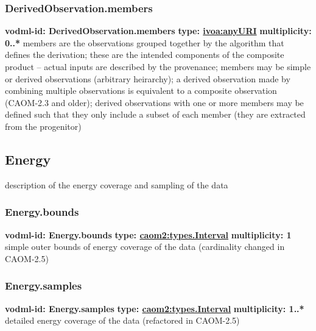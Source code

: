     \subsubsection{DerivedObservation.members}
      \textbf{vodml-id: DerivedObservation.members} \newline
      \textbf{type: \hyperref[sect:ivoa]{ivoa:anyURI}} \newline
      \textbf{multiplicity: 0..*} \newline
      members are the observations grouped together by the algorithm that defines the derivation; these are the intended components of the composite product -- actual inputs are described by the provenance; members may be simple or derived observations (arbitrary heirarchy); a derived observation made by combining multiple observations is equivalent to a composite observation (CAOM-2.3 and older); derived observations with one or more members may be defined such that they only include a subset of each member (they are extracted from the progenitor)

  \subsection{Energy}
  \label{sect:Energy}
    description of the energy coverage and sampling of the data

    \subsubsection{Energy.bounds}
      \textbf{vodml-id: Energy.bounds} \newline
      \textbf{type: \hyperref[sect:types.Interval]{caom2:types.Interval}} \newline
      \textbf{multiplicity: 1} \newline
      simple outer bounds of energy coverage of the data (cardinality changed in CAOM-2.5)

    \subsubsection{Energy.samples}
      \textbf{vodml-id: Energy.samples} \newline
      \textbf{type: \hyperref[sect:types.Interval]{caom2:types.Interval}} \newline
      \textbf{multiplicity: 1..*} \newline
      detailed energy coverage of the data (refactored in CAOM-2.5)

